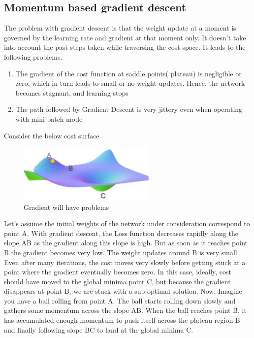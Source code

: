 \subsection{Momentum based gradient descent}
\FloatBarrier
The problem with gradient descent is that the weight update at a moment is governed by the
learning rate and gradient at that moment only. 
It doesn’t take into account the past steps taken while traversing the cost space.
It leads to the following problems.
\begin{enumerate}
	\item The gradient of the cost function at saddle points( plateau) is negligible or zero,
		which in turn leads to small or no weight updates. 
		Hence, the network becomes stagnant, and learning stops
    \item The path followed by Gradient Descent is very jittery even when 
		operating with mini-batch mode
\end{enumerate}
Consider the below cost surface.
\begin{figure}[htb] 
	\label{fig:gradient_problem}
	\centering
	\includegraphics[width=0.6\textwidth]{figures/gradient_problem}
	\caption{Gradient will have problems}
\end{figure}
Let’s assume the initial weights of the network under consideration correspond to point A. 
With gradient descent, the Loss function decreases rapidly along the slope AB as the gradient
along this slope is high.
But as soon as it reaches point B the gradient becomes very low. The weight updates around B 
is very small. Even after many iterations, the cost moves very slowly before getting stuck at a
point where the gradient eventually becomes zero.
In this case, ideally, cost should have moved to the global minima point C,
but because the gradient disappears at point B, we are stuck with a sub-optimal solution.
Now, Imagine you have a ball rolling from point A. The ball starts rolling down slowly and gathers
some momentum across the slope AB. 
When the ball reaches point B, it has accumulated enough momentum to push itself across the
plateau region B and finally following slope BC to land at the global minima C.
